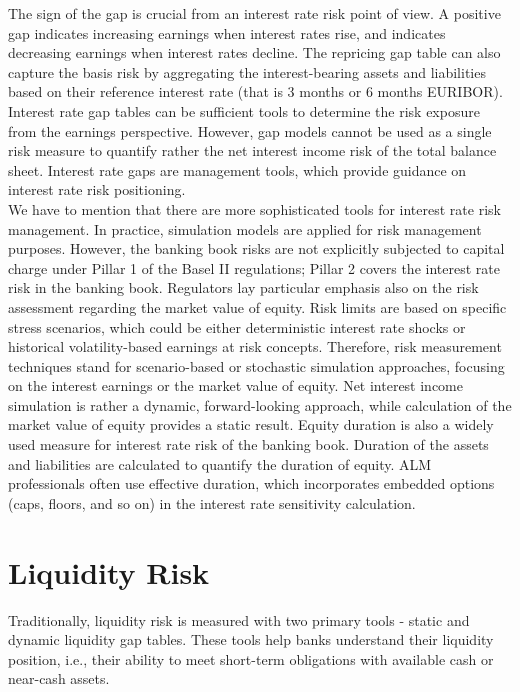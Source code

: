 \documentclass[11pt]{report}
\begin{document}
The sign of the gap is crucial from an interest rate risk point of view. A positive
gap indicates increasing earnings when interest rates rise, and indicates decreasing earnings when interest rates decline. The repricing gap table can also capture the basis risk by aggregating the interest-bearing assets and liabilities based on their reference interest rate (that is 3 months or 6 months EURIBOR). Interest rate gap tables can be sufficient tools to determine the risk exposure from the earnings perspective. However, gap models cannot be used as a single risk measure to quantify rather the net interest income risk of the total balance sheet. Interest rate gaps are management tools, which provide guidance on interest rate risk positioning.\\

We have to mention that there are more sophisticated tools for interest rate risk management. In practice, simulation models are applied for risk management purposes. However, the banking book risks are not explicitly subjected to capital charge under Pillar 1 of the Basel II regulations; Pillar 2 covers the interest rate
risk in the banking book. Regulators lay particular emphasis also on the risk assessment regarding the market value of equity. Risk limits are based on specific stress scenarios, which could be either deterministic interest rate shocks or historical volatility-based earnings at risk concepts. Therefore, risk measurement techniques stand for scenario-based or stochastic simulation approaches, focusing on the interest earnings or the market value of equity. Net interest income simulation is rather a dynamic, forward-looking approach, while calculation of the market value of equity provides a static result. Equity duration is also a widely used measure for interest rate risk of the banking book. Duration of the assets and liabilities are calculated
to quantify the duration of equity. ALM professionals often use effective duration, which incorporates embedded options (caps, floors, and so on) in the interest rate sensitivity calculation.



\section{Liquidity Risk}

Traditionally, liquidity risk is measured with two primary tools - static and dynamic liquidity gap tables. These tools help banks understand their liquidity position, i.e., their ability to meet short-term obligations with available cash or near-cash assets.\\
\end{document}
